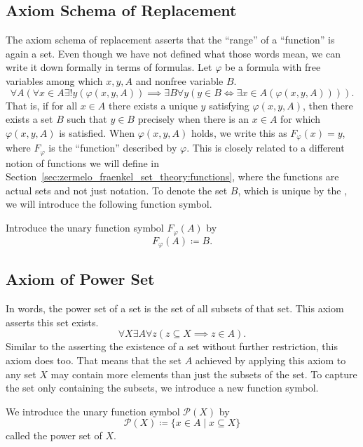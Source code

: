 \documentclass[../main.tex]{subfiles}
\begin{document}
\subsection*{Axiom Schema of Replacement}\label{subsec:zermelo_fraenkel_set_theory:axiom_schema_of_replacement}
The axiom schema of replacement asserts that the ``range'' of a ``function'' is again a set. Even though we have not defined what those words mean, we can write it down formally in terms of formulas. Let $\varphi$ be a formula with free variables among which $x,y,A$ and nonfree variable $B$.
\begin{equation*}
    \forall A(\forall x\in A\exists!y(\varphi(x,y,A))\implies\exists B\forall y(y\in B\iff\exists x\in A(\varphi(x,y,A)))).
\end{equation*}
That is, if for all $x\in A$ there exists a unique $y$ satisfying $\varphi(x,y,A)$, then there exists a set $B$ such that $y\in B$ precisely when there is an $x\in A$ for which $\varphi(x,y,A)$ is satisfied. When $\varphi(x,y,A)$ holds, we write this as $F_\varphi(x)=y$, where $F_\varphi$ is the ``function'' described by $\varphi$. This is closely related to a different notion of functions we will define in Section~\ref{sec:zermelo_fraenkel_set_theory:functions}, where the functions are actual sets and not just notation. To denote the set $B$, which is unique by the , we will introduce the following function symbol.
\begin{definition}
    Introduce the unary function symbol $F_\varphi(A)$ by
    \begin{equation*}
        F_\varphi(A)\coloneq B.
    \end{equation*}
\end{definition}

\subsection*{Axiom of Power Set}\label{subsec:zermelo_fraenkel_set_theory:axiom_of_power_set}
In words, the power set of a set is the set of all subsets of that set. This axiom asserts this set exists.
\begin{equation*}
    \forall X\exists A\forall z(z\subseteq X\implies z\in A).
\end{equation*}
Similar to the  asserting the existence of a set without further restriction, this axiom does too. That means that the set $A$ achieved by applying this axiom to any set $X$ may contain more elements than just the subsets of the set. To capture the set only containing the subsets, we introduce a new function symbol.
\begin{definition}
    We introduce the unary function symbol $\mathcal{P}(X)$ by
    \begin{equation*}
        \mathcal{P}(X)\coloneq\{x\in A\mid x\subseteq X\}
    \end{equation*}
    called the power set of $X$.
\end{definition}
\end{document}
